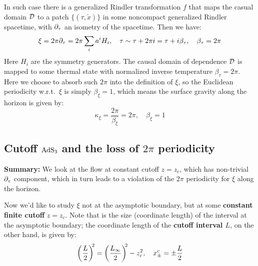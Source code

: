 \documentclass[11pt,a4paper]{article}
\begin{document}
	In such case there is a generalized Rindler transformation $f$ that maps the casual domain $\mathcal{D}$ to a patch $\{(\tau,\tilde{x})\}$ in some noncompact generalized Rindler spacetime, with $\partial_{\tau}$ an isometry of the spacetime. Then we have:
	\begin{equation}
		\xi = 2\pi \partial_{\tau}
		= 2\pi \sum_i a^i H_i,
	\quad
		\tau \sim \tau + 2\pi i
		= \tau + i\beta_\tau,
	\quad
		\beta_\tau = 2\pi
	\end{equation}
	Here $H_i$ are the symmetry generators. The causal domain of dependence $\mathcal{D}$ is mapped to some thermal state with normalized inverse temperature $\beta_\tau = 2\pi$. Here we choose to absorb such $2\pi$ into the definition of $\xi$, so the Euclidean periodicity w.r.t.~$\xi$ is simply $\beta_\xi = 1$, which means the surface gravity along the horizon is given by:
	\begin{equation}
		\kappa_\xi = \frac{2\pi}{\beta_\xi} = 2\pi,
	\quad
		\beta_\xi = 1
	\end{equation}

\pagebreak

	
\FloatBarrier
\pagebreak
\subsection{Cutoff $\mathrm{AdS}_3$ and the loss of $2\pi$ periodicity}

\textbf{Summary:} We look at the flow at constant cutoff $z = z_c$, which has non-trivial $\partial_{z}$ component, which in turn leads to a violation of the $2\pi$ periodicity for $\xi$ along the horizon.
	
	Now we'd like to study $\xi$ not at the asymptotic boundary, but at some \textbf{constant finite cutoff} $z = z_c$. 
	Note that is the size (coordinate length) of the interval at the {asymptotic boundary}; the coordinate length of the \textbf{cutoff interval $L$}, on the other hand, is given by:
	\begin{equation}
		\pqty{\frac{L}{2}}^{\!\!2}
		= \pqty{\frac{L_\infty}{2}}^{\!\!2} - z_c^2,
	\quad
		x_\pm^c
		= \pm \frac{L}{2}
	\label{eq:length_relations}
	\end{equation}
	
\end{document}
